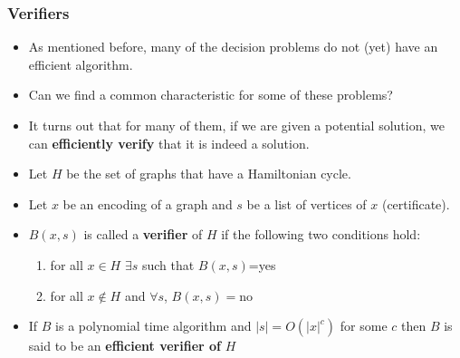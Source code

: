 \documentclass{beamer}
\begin{document}
\begin{frame}
  \frametitle{Verifiers}
  \begin{itemize}
  \item As mentioned before, many of the decision problems do not (yet) have an efficient algorithm.
  \item Can we find a common characteristic for some of these problems?
  \item It turns out that for many of them, if we are given a potential solution, we can \textbf{efficiently verify} that it is indeed a solution.
  \end{itemize}
\end{frame}

\begin{frame}
  \begin{itemize}
  \item Let $H$ be the set of graphs that have a Hamiltonian cycle.
  \item Let $x$ be an encoding of a graph and $s$ be a list of vertices of $x$ (certificate).
  \item $B(x,s)$ is called a \textbf{verifier} of $H$  if the following two conditions hold:

    \begin{enumerate}
    \item for all $x\in H$ $\exists s$ such that $B(x,s)$=yes
\item for all $x\notin H$ and $\forall s$, $B(x,s)=$no 
    \end{enumerate}
  \item If $B$ is a polynomial time algorithm and $|s|=O(|x|^c)$ for some $c$ then $B$ is said to be an \textbf{efficient verifier of} $H$


  \end{itemize}
\end{frame}
\end{document}
